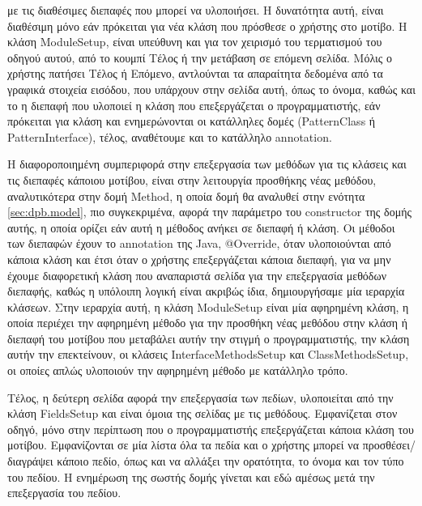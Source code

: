 με τις διαθέσιμες διεπαφές που μπορεί να υλοποιήσει. 
Η δυνατότητα αυτή, είναι διαθέσιμη μόνο εάν πρόκειται για νέα κλάση που πρόσθεσε ο χρήστης στο μοτίβο. 
Η κλάση ModuleSetup, είναι υπεύθυνη και για τον χειρισμό του τερματισμού του οδηγού αυτού, από το κουμπί Τέλος 
ή την μετάβαση σε επόμενη σελίδα. 
Μόλις ο χρήστης πατήσει Τέλος ή Επόμενο, αντλούνται τα απαραίτητα δεδομένα από τα γραφικά στοιχεία εισόδου, 
που υπάρχουν στην σελίδα αυτή, όπως το όνομα, καθώς και το η διεπαφή που υλοποιεί η κλάση που επεξεργάζεται ο προγραμματιστής, 
εάν πρόκειται για κλάση και ενημερώνονται οι κατάλληλες δομές (PatternClass ή PatternInterface), τέλος, αναθέτουμε και το κατάλληλο annotation.
\par
Η διαφοροποιημένη συμπεριφορά στην επεξεργασία των μεθόδων για τις κλάσεις και τις διεπαφές κάποιου μοτίβου, 
είναι στην λειτουργία προσθήκης νέας μεθόδου, αναλυτικότερα στην δομή Method, η οποία δομή θα αναλυθεί στην ενότητα \ref{sec:dpb.model}, 
πιο συγκεκριμένα, αφορά  την παράμετρο του constructor της δομής αυτής, η οποία ορίζει εάν αυτή η μέθοδος ανήκει σε διεπαφή ή κλάση. 
Οι μέθοδοι των διεπαφών έχουν το annotation της Java, @Override, όταν υλοποιούνται από κάποια κλάση 
και έτσι όταν ο χρήστης επεξεργάζεται κάποια διεπαφή, για να μην έχουμε διαφορετική κλάση που αναπαριστά σελίδα 
για την επεξεργασία μεθόδων διεπαφής, καθώς η υπόλοιπη λογική είναι ακριβώς ίδια, δημιουργήσαμε μία ιεραρχία κλάσεων. 
Στην ιεραρχία αυτή, η κλάση \mbox{ModuleSetup} είναι μία αφηρημένη κλάση, η οποία περιέχει την αφηρημένη μέθοδο για την προσθήκη 
νέας μεθόδου στην κλάση ή διεπαφή του μοτίβου που μεταβάλει αυτήν την στιγμή ο προγραμματιστής, την κλάση αυτήν την επεκτείνουν, 
οι κλάσεις InterfaceMethodsSetup και ClassMethodsSetup, οι οποίες απλώς υλοποιούν την αφηρημένη μέθοδο με κατάλληλο τρόπο.
\par
Τέλος, η δεύτερη σελίδα αφορά την επεξεργασία των πεδίων, υλοποιείται από την κλάση FieldsSetup και είναι όμοια της σελίδας με τις μεθόδους.
Εμφανίζεται στον οδηγό, μόνο στην περίπτωση που ο προγραμματιστής επεξεργάζεται κάποια κλάση του μοτίβου.  
Εμφανίζονται σε μία λίστα όλα τα πεδία και ο χρήστης μπορεί να προσθέσει/διαγράψει κάποιο πεδίο, όπως και να αλλάξει την ορατότητα,
το όνομα και τον τύπο του πεδίου. Η ενημέρωση της σωστής δομής γίνεται και εδώ αμέσως μετά την επεξεργασία του πεδίου.

